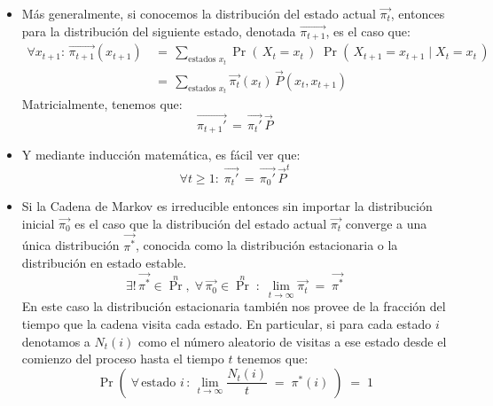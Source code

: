 \documentclass[ 10pt, xcolor = dvipsnames]{beamer}
\begin{document}
\begin{frame}[allowframebreaks]
\begin{itemize}
\item M\'as generalmente, si conocemos la distribuci\'on del estado actual $\vec{\pi_t}$, entonces para la distribuci\'on del siguiente estado, denotada $\vec{\pi_{t+1}}$, \linebreak es el caso que: 
\begin{align*}
\forall x_{t+1} \colon \, \vec{\pi_{t+1}}(x_{t+1}) \, 
& = \, \sum_{\text{estados } x_t} \Pr( \, X_t = x_t \, ) \; \Pr( \, X_{t+1} = x_{t+1} \mid X_t = x_t \, ) \\[1ex]
& = \, \sum_{\text{estados } x_t} \vec{\pi_t}(x_t) \, \vec{P}(x_t,x_{t+1})
\end{align*}
Matricialmente, tenemos que: 
\[
\vec{\pi_{t+1}'} \, = \, \vec{\pi_t'} \, \vec{P}
\]
\item Y mediante inducci\'on matem\'atica, es f\'acil ver que: 
\[
\forall t \geq 1 \colon \;
\vec{\pi_t'} \, = \, \vec{\pi_0'} \, \vec{P}^t
\]
\end{itemize}
\framebreak

\begin{itemize}
\item Si la Cadena de Markov es irreducible entonces sin importar la distribuci\'on inicial $\vec{\pi_0}$ es el caso que la distribuci\'on del estado actual $\vec{\pi_t}$ converge a una \'unica distribuci\'on $\vec{\pi^*}$, conocida como la distribuci\'on estacionaria o la distribuci\'on en estado estable. \Iec 
\[
\exists! \, \vec{\pi^*} \in \Pr^n, \; \forall \, \vec{\pi_0} \in \Pr^n \; \colon \;
\lim_{ t \rightarrow \infty } \vec{\pi_t} \; = \;
\vec{\pi^*}
\]
En este caso la distribuci\'on estacionaria tambi\'en nos provee de la fracci\'on del tiempo que la cadena visita cada estado. En particular, si para cada estado $i$ denotamos a $N_t(i)$ como el n\'umero aleatorio de visitas a ese estado desde el comienzo del proceso hasta el tiempo $t$ tenemos que: 
\[
\Pr \left( \;
\forall \, \text{estado } i \, \colon \, \lim_{ t \rightarrow \infty } \frac{N_t(i)}{t} \; = \; \pi^*(i) \; \right) \; = \; 1
\]
\end{itemize}
\framebreak


\end{frame}
\end{document}
